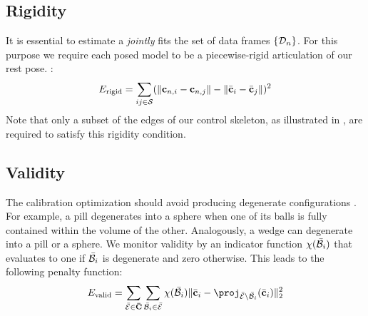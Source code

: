 \subsection*{Rigidity}
It is essential to estimate a  \emph{jointly} fits the set of data frames $\{ \mathcal{D}_n \}$. For this purpose we require each posed model to be a piecewise-rigid articulation of our rest pose. :
% 
\begin{equation}
E_{\text{rigid}} = 
\sum_{ij \in \mathcal{S}} (\| \mathbf{c}_{n,i} - \mathbf{c}_{n,j} \| - \| \bar{\mathbf{c}}_i - \bar{\mathbf{c}}_j \|)^2
\end{equation}
% 
Note that only a subset of the edges of our control skeleton, as illustrated in , are required to satisfy this rigidity condition.

\subsection*{Validity}
The calibration optimization should avoid producing degenerate configurations . For example, a pill degenerates into a sphere when one of its balls is fully contained within  the volume of the other. Analogously, a wedge can degenerate into a pill or a sphere. We monitor validity by an indicator function $\chi(\bar{\mathcal{B}}_i)$ that evaluates to one if $\bar{\mathcal{B}}_i$ is degenerate and zero otherwise.
% 
% 
This leads to the following  penalty function:
% 
\begin{equation}
E_{\text{valid}} = 
\sum_{\bar\oneelement \in \restcenters}
\sum_{\bar\ball_i \in \bar\oneelement} 
\chi(\bar\ball_i) 
\| \bar\ballcenter_i - \proj_{\bar\oneelement \setminus \bar\ball_i}(\bar\ballcenter_i) \|_2^2
\end{equation}
% 
 
